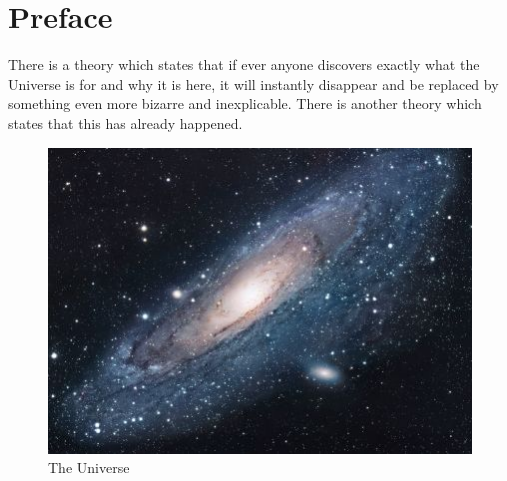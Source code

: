 
\chapter*{Preface}

There is a theory which states that if ever anyone discovers exactly what the Universe is for and why it is here, it will instantly disappear and be replaced by something even more bizarre and inexplicable.
There is another theory which states that this has already happened. \cite{adams1981restaurant}

\begin{figure}[h!]
\centering
\includegraphics[scale=1.7]{./img/universe.jpg}
\caption{The Universe}
\label{fig:universe}
\end{figure}
